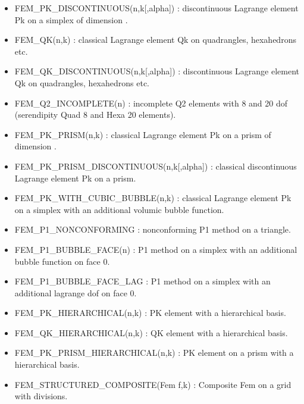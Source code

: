\documentclass[a4paper,11pt,english]{sphinxmanual}
\begin{document}
\begin{fulllineitems}
\begin{itemize}
\begin{itemize}
\item {} 
FEM\_PK\_DISCONTINUOUS(n,k{[},alpha{]}) :
discontinuous Lagrange element Pk on a simplex of dimension .

\item {} 
FEM\_QK(n,k) :
classical Lagrange element Qk on quadrangles, hexahedrons etc.

\item {} 
FEM\_QK\_DISCONTINUOUS(n,k{[},alpha{]}) :
discontinuous Lagrange element Qk on quadrangles, hexahedrons etc.

\item {} 
FEM\_Q2\_INCOMPLETE(n) :
incomplete Q2 elements with 8 and 20 dof (serendipity Quad 8 and
Hexa 20 elements).

\item {} 
FEM\_PK\_PRISM(n,k) :
classical Lagrange element Pk on a prism of dimension .

\item {} 
FEM\_PK\_PRISM\_DISCONTINUOUS(n,k{[},alpha{]}) :
classical discontinuous Lagrange element Pk on a prism.

\item {} 
FEM\_PK\_WITH\_CUBIC\_BUBBLE(n,k) :
classical Lagrange element Pk on a simplex with an additional
volumic bubble function.

\item {} 
FEM\_P1\_NONCONFORMING :
non\sphinxhyphen{}conforming P1 method on a triangle.

\item {} 
FEM\_P1\_BUBBLE\_FACE(n) :
P1 method on a simplex with an additional bubble function on face 0.

\item {} 
FEM\_P1\_BUBBLE\_FACE\_LAG :
P1 method on a simplex with an additional lagrange dof on face 0.

\item {} 
FEM\_PK\_HIERARCHICAL(n,k) :
PK element with a hierarchical basis.

\item {} 
FEM\_QK\_HIERARCHICAL(n,k) :
QK element with a hierarchical basis.

\item {} 
FEM\_PK\_PRISM\_HIERARCHICAL(n,k) :
PK element on a prism with a hierarchical basis.

\item {} 
FEM\_STRUCTURED\_COMPOSITE(Fem f,k) :
Composite Fem  on a grid with  divisions.


\end{itemize}
\end{itemize}
\end{fulllineitems}
\end{document}
